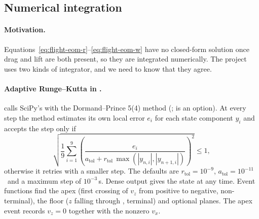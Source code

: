\subsection{Numerical integration}
\label{sec:flight-numerics}

\paragraph{Motivation.}
Equations~\eqref{eq:flight-eom-r}--\eqref{eq:flight-eom-w} have no closed-form solution once drag and lift
are both present, so they are integrated numerically.
The project uses two kinds of integrator, and we need to know that they agree.

\paragraph{Adaptive Runge--Kutta in .}
 calls SciPy's  with the Dormand--Prince 5(4) method (;
 is an option).
At every step the method estimates its own local error $e_i$ for each state component $y_i$ and
accepts the step only if
\begin{equation}
  \sqrt{\frac{1}{9}\sum_{i=1}^{9}\left(\frac{e_i}{a_{\mathrm{tol}} + r_{\mathrm{tol}}\,\max(|y_{n,i}|,|y_{n+1,i}|)}\right)^{2}} \le 1 ,
  \label{eq:flight-tol}
\end{equation}
otherwise it retries with a smaller step.
The defaults are $r_{\mathrm{tol}} = 10^{-9}$\assumed, $a_{\mathrm{tol}} = 10^{-11}$\assumed\ and a maximum
step of $10^{-3}$\,\unit{s}\assumed.
Dense output gives the state at any time.
Event functions find the apex (first crossing of $v_z$ from positive to negative, non-terminal),
the floor ($z$ falling through , terminal) and optional planes.
The apex event records $v_z = 0$ together with the nonzero $v_x$.

